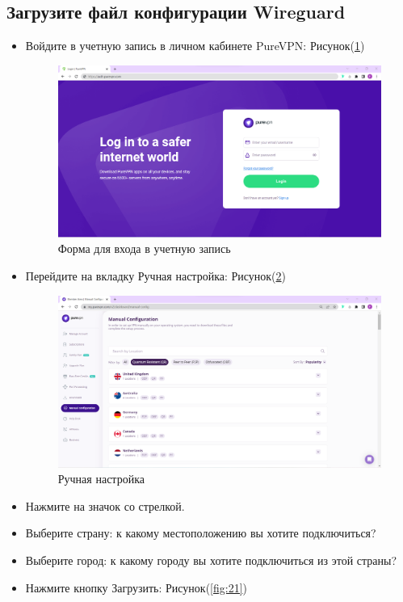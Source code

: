 \subsection{Загрузите файл конфигурации Wireguard} 
\begin{itemize}
\item Войдите в учетную запись в личном кабинете PureVPN:  Рисунок(\ref{fig:19})
\begin{figure}[H]
\includegraphics[width=12cm]{14.png}
\centering
\caption{Форма для входа в учетную запись}
\label{fig:19}
\end{figure}
\item Перейдите на вкладку Ручная настройка:  Рисунок(\ref{fig:20})
\begin{figure}[H]
\includegraphics[width=12cm]{15.png}
\centering
\caption{Ручная настройка}
\label{fig:20}
\end{figure}
\item Нажмите на значок со стрелкой.
\item Выберите страну: к какому местоположению вы хотите подключиться?
\item Выберите город: к какому городу вы хотите подключиться из этой страны?
\item Нажмите кнопку Загрузить:  Рисунок(\ref{fig:21})
\begin{figure}[H]

\end{figure}
\end{itemize}
